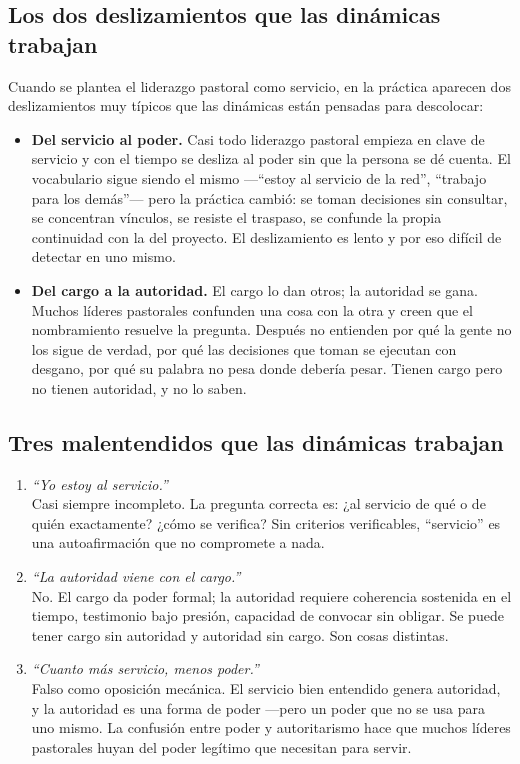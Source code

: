 \documentclass[11pt, a4paper]{article}
\begin{document}
\subsection*{Los dos deslizamientos que las dinámicas trabajan}

Cuando se plantea el liderazgo pastoral como servicio, en la práctica aparecen dos deslizamientos muy típicos que las dinámicas están pensadas para descolocar:

\begin{itemize}
  \item \textbf{Del servicio al poder.} Casi todo liderazgo pastoral empieza en clave de servicio y con el tiempo se desliza al poder sin que la persona se dé cuenta. El vocabulario sigue siendo el mismo ---``estoy al servicio de la red'', ``trabajo para los demás''--- pero la práctica cambió: se toman decisiones sin consultar, se concentran vínculos, se resiste el traspaso, se confunde la propia continuidad con la del proyecto. El deslizamiento es lento y por eso difícil de detectar en uno mismo.
  \item \textbf{Del cargo a la autoridad.} El cargo lo dan otros; la autoridad se gana. Muchos líderes pastorales confunden una cosa con la otra y creen que el nombramiento resuelve la pregunta. Después no entienden por qué la gente no los sigue de verdad, por qué las decisiones que toman se ejecutan con desgano, por qué su palabra no pesa donde debería pesar. Tienen cargo pero no tienen autoridad, y no lo saben.
\end{itemize}

\subsection*{Tres malentendidos que las dinámicas trabajan}

\begin{enumerate}[label={\color{liderazgoVino}\arabic*.}]
  \item \emph{``Yo estoy al servicio.''} \\
        Casi siempre incompleto. La pregunta correcta es: ¿al servicio de qué o de quién exactamente? ¿cómo se verifica? Sin criterios verificables, ``servicio'' es una autoafirmación que no compromete a nada.
  \item \emph{``La autoridad viene con el cargo.''} \\
        No. El cargo da poder formal; la autoridad requiere coherencia sostenida en el tiempo, testimonio bajo presión, capacidad de convocar sin obligar. Se puede tener cargo sin autoridad y autoridad sin cargo. Son cosas distintas.
  \item \emph{``Cuanto más servicio, menos poder.''} \\
        Falso como oposición mecánica. El servicio bien entendido genera autoridad, y la autoridad es una forma de poder ---pero un poder que no se usa para uno mismo. La confusión entre poder y autoritarismo hace que muchos líderes pastorales huyan del poder legítimo que necesitan para servir.
\end{enumerate}
\end{document}
